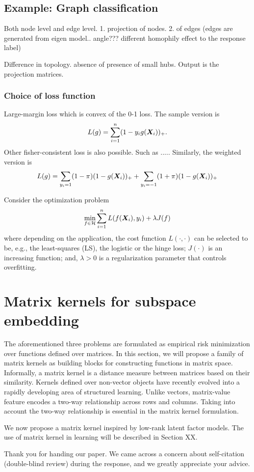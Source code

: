 \documentclass[12pt]{article}
\begin{document}
\subsection{Example: Graph classification}
Both node level and edge level. 1. projection of nodes. 2. of edges (edges are generated from eigen model.. angle??? different homophily effect to the response label)

Difference in topology. absence of presence of small hubs. Output is the projection matrices. 


\subsubsection{Choice of loss function}
Large-margin loss which is convex of the 0-1 loss. The sample version is
\[
L(g)=\sum_{i=1}^n (1-y_ig(\bm X_i))_{+}.
\]
Other fisher-consistent loss is also possible. Such as ..... 
Similarly, the weighted version is 
\[
L(g)=\sum_{y_i=1}(1-\pi)(1-g(\bm X_i))_{+}+\sum_{y_i=-1}(1+\pi)(1-g(\bm X_i))_{+}
\]

Consider the optimization problem
\[
\min_{f\in \mathcal{H}} \sum_{i=1}^n L(f(\bm X_i),y_i)+\lambda J(f)
\]
where depending on the application, the cost function $L(\cdot, \cdot)$ can be selected to be, e.g., the least-squares (LS), the logistic or the hinge loss; $J(\cdot)$ is an increasing function; and, $\lambda >0$ is a regularization parameter that controls overfitting. 

\section{Matrix kernels for subspace embedding}
The aforementioned three problems are formulated as empirical risk minimization over functions defined over matrices.  
In this section, we will propose a family of matrix kernels as building blocks for constructing functions in matrix space. 
Informally, a matrix kernel is a distance measure between matrices based on their similarity. 
Kernels defined over non-vector objects have recently evolved into a rapidly developing area of structured learning. 
Unlike vectors, matrix-value feature encodes a two-way relationship across rows and columns. 
Taking into account the two-way relationship is essential in the matrix kernel formulation.

We now propose a matrix kernel inspired by low-rank latent factor models. The use of matrix kernel in learning will be described in Section XX.

Thank you for handing our paper. We came across a concern about self-citation (double-blind review) during the response, and we greatly appreciate your advice. 
\end{document}
